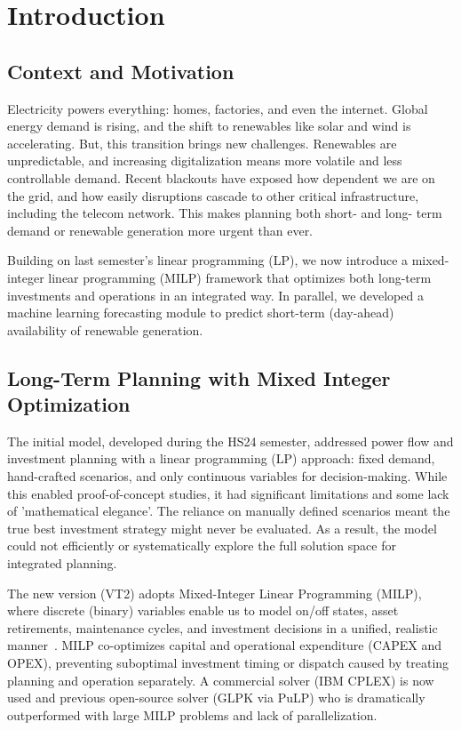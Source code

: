 \newpage
\section{Introduction}
\label{sec:intro_lit}

\subsection{Context and Motivation}
Electricity powers everything: homes, factories, and even the internet. 
Global energy demand is rising, and the shift to renewables like solar and wind is accelerating. But, 
this transition brings new challenges. Renewables are unpredictable, and increasing digitalization means 
more volatile and less controllable demand. Recent blackouts have exposed how dependent we are on the grid, 
and how easily disruptions cascade to other critical infrastructure, including the telecom network. 
This makes planning both short- and long- term demand or renewable generation more urgent than ever.

Building on last semester's linear programming (LP), we now introduce a mixed-integer linear programming (MILP) framework 
that optimizes both long-term investments and operations in an integrated way. In parallel, we developed a machine 
learning forecasting module to predict short-term (day-ahead) availability of renewable generation.

\subsection{Long-Term Planning with Mixed Integer Optimization}
The initial model, developed during the HS24 semester, addressed power flow and investment planning 
with a linear programming (LP) approach: fixed demand, hand-crafted scenarios, and only continuous 
variables for decision-making. While this enabled proof-of-concept studies, it had significant 
limitations and some lack of 'mathematical elegance'. The reliance on manually defined scenarios meant the true 
best investment strategy might never be evaluated. As a result, the model could not efficiently or systematically 
explore the full solution space for integrated planning.

The new version (VT2) adopts Mixed-Integer Linear Programming (MILP), where discrete (binary) variables 
enable us to model on/off states, asset retirements, maintenance cycles, and investment decisions in a unified, 
realistic manner~\cite{andersson2004power, wood2013power}. MILP co-optimizes capital and operational expenditure 
(CAPEX and OPEX), preventing suboptimal investment timing or dispatch caused by treating planning and operation 
separately. A commercial solver (IBM CPLEX) is now used and previous open-source solver (GLPK via PuLP) who 
is dramatically outperformed with large MILP problems and lack of parallelization.

